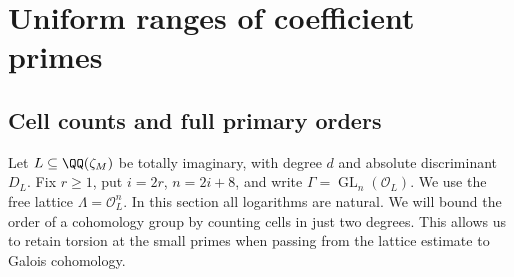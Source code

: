 \documentclass[a4paper,11pt]{article}
\theoremstyle{definition}
\theoremstyle{remark}
\numberwithin{equation}{section}
\newcommand{\GL}{\operatorname{GL}}
\newcommand{\OO}{\mathcal O}
\begin{document}
\section{Uniform ranges of coefficient primes}\label{nav:g-II-2}

\subsection{Cell counts and full primary orders}\label{nav:II-17}
\label{sec:cells103}

Let \(L\subseteq\QQ(\zeta_M)\) be totally imaginary, with degree
\(d\) and absolute discriminant \(D_L\). Fix \(r\ge1\), put
\(i=2r\), \(n=2i+8\), and write \(\Gamma=\GL_n(\OO_L)\).
We use the free lattice \(\Lambda=\OO_L^n\). In this section all
logarithms are natural. We will bound the order of a cohomology
group by counting cells in just two degrees. This allows us to
retain torsion at the small primes when passing from the lattice
estimate to Galois cohomology.
\end{document}
